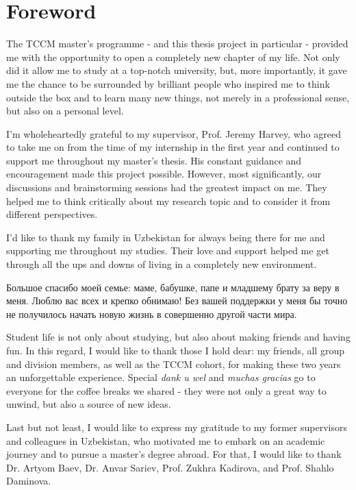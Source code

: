 \chapter*{Foreword}  

The TCCM master's programme - and this thesis project in particular - provided me with the opportunity to open a completely new chapter of my life. Not only did it allow me to study at a top-notch university, but, more importantly, it gave me the chance to be surrounded by brilliant people who inspired me to think outside the box and to learn many new things, not merely in a professional sense, but also on a personal level.

\par\smallskip
I'm wholeheartedly grateful to my supervisor, Prof. Jeremy Harvey, who agreed to take me on from the time of my internship in the first year and continued to support me throughout my master's thesis. His constant guidance and encouragement made this project possible. However, most significantly, our discussions and brainstorming sessions had the greatest impact on me. They helped me to think critically about my research topic and to consider it from different perspectives.

\par\smallskip
I'd like to thank my family in Uzbekistan for always being there for me and supporting me throughout my studies. Their love and support helped me get through all the ups and downs of living in a completely new environment. \begin{otherlanguage}{russian} Большое спасибо моей семье: маме, бабушке, папе и младшему брату за веру в меня. Люблю вас всех и крепко обнимаю! Без вашей поддержки у меня бы точно не получилось начать новую жизнь в совершенно другой части мира. \end{otherlanguage}

\par\smallskip
Student life is not only about studying, but also about making friends and having fun. In this regard, I would like to thank those I hold dear: my friends, all group and division members, as well as the TCCM cohort, for making these two years an unforgettable experience. Special \textit{dank u wel} and \textit{muchas gracias} go to everyone for the coffee breaks we shared - they were not only a great way to unwind, but also a source of new ideas.

\par\smallskip
Last but not least, I would like to express my gratitude to my former supervisors and colleagues in Uzbekistan, who motivated me to embark on an academic journey and to pursue a master's degree abroad. For that, I would like to thank Dr. Artyom Baev, Dr. Anvar Sariev, Prof. Zukhra Kadirova, and Prof. Shahlo Daminova. 


